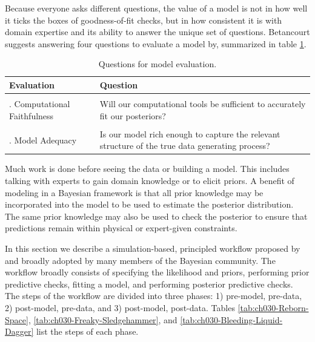 \documentclass[11pt, oneside, openany]{scrbook}
\begin{document}
Because everyone asks different questions, the value of a model is not in how well it ticks the boxes of goodness-of-fit checks, but in how consistent it is with domain expertise and its ability to answer the unique set of questions. Betancourt suggests answering four questions to evaluate a model by, summarized in table \ref{tab:ch030-Confidential-Proton}.

\begin{table}[!h]
\centering
\caption{\label{tab:ch030-Confidential-Proton}Questions for model evaluation.}
\centering
\begin{tabular}[t]{>{\raggedright\arraybackslash}p{1.75in}>{\raggedright\arraybackslash}p{3.25in}}
\toprule
Evaluation & Question\\
\midrule
\cellcolor{gray!10}{1. Domain Expertise Consistency} & \cellcolor{gray!10}{Is our model consistent with our domain expertise?}\\
2. Computational Faithfulness & Will our computational tools be sufficient to accurately fit our posteriors?\\
\cellcolor{gray!10}{3. Inferential Adequacy} & \cellcolor{gray!10}{Will our inferences provide enough information to answer our questions?}\\
4. Model Adequacy & Is our model rich enough to capture the relevant structure of the true data generating process?\\
\bottomrule
\end{tabular}
\end{table}

Much work is done before seeing the data or building a model. This includes talking with experts to gain domain knowledge or to elicit priors. A benefit of modeling in a Bayesian framework is that all prior knowledge may be incorporated into the model to be used to estimate the posterior distribution. The same prior knowledge may also be used to check the posterior to ensure that predictions remain within physical or expert-given constraints.

In this section we describe a simulation-based, principled workflow proposed by \citet{betancourt2020} and broadly adopted by many members of the Bayesian community. The workflow broadly consists of specifying the likelihood and priors, performing prior predictive checks, fitting a model, and performing posterior predictive checks. The steps of the workflow are divided into three phases: 1) pre-model, pre-data, 2) post-model, pre-data, and 3) post-model, post-data. Tables \ref{tab:ch030-Reborn-Space}, \ref{tab:ch030-Freaky-Sledgehammer}, and \ref{tab:ch030-Bleeding-Liquid-Dagger} list the steps of each phase.
\end{document}
